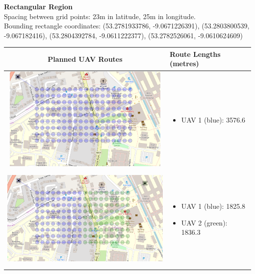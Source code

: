 \textbf{Rectangular Region}
\\Spacing between grid points: 23m in latitude, 25m in longitude.
\\Bounding rectangle coordinates: (53.2781933786, -9.0671226391), (53.2803800539, -9.067182416), (53.2804392784, -9.0611222377), (53.2782526061, -9.0610624609)
\\
\begin{table}[h!]
  \centering
  \begin{tabular}{ | c | m{5cm} | }
    \hline
    Planned UAV Routes & Route Lengths (metres) \\
    \hline
    
    \begin{minipage}[c][53mm][c]{.6\textwidth}
      \includegraphics[width=\linewidth, height=51mm]{Chapters/MultiAgentCoverage/MultipleTravellingSalesman/Figs/Rectangle/SingleAgent.PNG}

    \end{minipage}
    &
    \begin{itemize}[leftmargin=*]
      \item[] UAV 1 (blue): 3576.6
    \end{itemize}
    \\
    \hline
    \begin{minipage}[c][53mm][c]{.6\textwidth}
      \includegraphics[width=\linewidth, height=51mm]{Chapters/MultiAgentCoverage/MultipleTravellingSalesman/Figs/Rectangle/TwoAgent.PNG}
    \end{minipage}
    &
    \begin{itemize}[leftmargin=*]
        \item[] UAV 1 (blue): 1825.8
        \item[] UAV 2 (green): 1836.3
    \end{itemize}
    \\
    \hline
    

\end{tabular}
\end{table}
